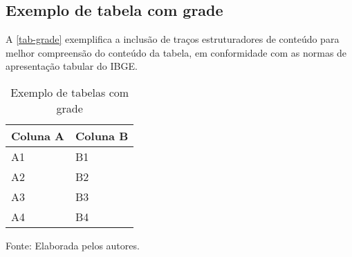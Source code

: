 \begin{apendicesenv}
\chapter{Exemplo de tabela com grade}
A \autoref{tab-grade} exemplifica a inclus\~ao de tra\c{c}os estruturadores de conte\'udo para melhor compreens\~ao do conte\'udo da tabela, em conformidade com as normas de apresenta\c{c}\~ao tabular do IBGE.
\begin{table}[htb]
\ABNTEXfontereduzida
\caption[Exemplo de tabelas com grade]{Exemplo de tabelas com grade}
\label{tab-grade}
\begin{tabular}{ >{\centering\arraybackslash}m{8cm} | >{\centering\arraybackslash}m{6cm} }
\hline
 \centering \textbf{Coluna A} & \textbf{Coluna B}\\
\hline
  A1 & B1\\
\hline
  A2 & B2\\
\hline
  A3 & B3\\
\hline
  A4 & B4\\
\hline
\end{tabular}
\begin{flushleft}
		Fonte: Elaborada pelos autores.\
\end{flushleft}
\end{table}


\end{apendicesenv}
